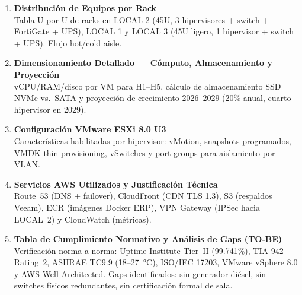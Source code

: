 \documentclass[11pt, a4paper, oneside]{report}
\begin{document}
\begin{enumerate}[label=\textbf{Anexo \Alph*.},leftmargin=4cm,labelsep=0.4cm,itemsep=14pt]

  \item {}\label{anex:rack}
  \textbf{Distribución de Equipos por Rack}\\
  Tabla U por U de racks en LOCAL 2 (45U, 3 hipervisores + switch + FortiGate + UPS),
  LOCAL 1 y LOCAL 3 (45U ligero, 1 hipervisor + switch + UPS). Flujo hot/cold aisle.

  \item {}\label{anex:dimensionamiento}
  \textbf{Dimensionamiento Detallado --- Cómputo, Almacenamiento y Proyección}\\
  vCPU/RAM/disco por VM para H1--H5, cálculo de almacenamiento SSD NVMe vs.\ SATA
  y proyección de crecimiento 2026--2029 (20\% anual, cuarto hipervisor en 2029).

  \item {}\label{anex:vmware}
  \textbf{Configuración VMware ESXi 8.0 U3}\\
  Características habilitadas por hipervisor: vMotion, snapshots programados,
  VMDK thin provisioning, vSwitches y port groups para aislamiento por VLAN.

  \item {}\label{anex:aws}
  \textbf{Servicios AWS Utilizados y Justificación Técnica}\\
  Route~53 (DNS + failover), CloudFront (CDN TLS 1.3), S3 (respaldos Veeam),
  ECR (imágenes Docker ERP), VPN Gateway (IPSec hacia LOCAL~2) y CloudWatch (métricas).

  \item {}\label{anex:cumplimiento}
  \textbf{Tabla de Cumplimiento Normativo y Análisis de Gaps (TO-BE)}\\
  Verificación norma a norma: Uptime Institute Tier~II (99.741\%), TIA-942 Rating~2,
  ASHRAE TC9.9 (18--27~°C), ISO/IEC 17203, VMware vSphere 8.0 y AWS Well-Architected.
  Gaps identificados: sin generador diésel, sin switches físicos redundantes,
  sin certificación formal de sala.

\end{enumerate}

\renewcommand{\bibname}{Referencias Normativas}

\end{document}
